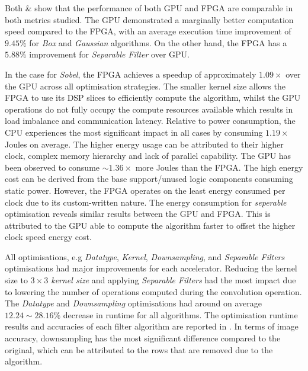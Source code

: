 Both  \&  show that the performance of both GPU and FPGA are comparable in both metrics studied. The GPU demonstrated a marginally better computation speed compared to the FPGA, with an average execution time improvement of $9.45\%$ for \textit{Box} and \textit{Gaussian} algorithms. On the other hand, the FPGA has a $5.88\%$ improvement for \textit{Separable Filter} over GPU. 

In the case for \textit{Sobel}, the FPGA achieves a speedup of approximately $1.09\times$ over the GPU across all optimisation strategies. The smaller kernel size allows the FPGA to use its DSP slices to efficiently compute the algorithm, whilst the GPU operations do not fully occupy the compute resources available which results in load imbalance and communication latency. Relative to power consumption, the CPU experiences the most significant impact in all cases by consuming $1.19\times$ Joules on average. The higher energy usage can be attributed to their higher clock, complex memory hierarchy and lack of parallel capability. The GPU has been observed to consume $\sim1.36\times$ more Joules than the FPGA. The high energy cost can be derived from the base support/unused logic components consuming static power. However, the FPGA operates on the least energy consumed per clock due to its custom-written nature. The energy consumption for \textit{seperable} optimisation reveals similar results between the GPU and FPGA. This is attributed to the GPU able to compute the algorithm faster to offset the higher clock speed energy cost. 

All optimisations, e.g \textit{Datatype}, \textit{Kernel}, \textit{Downsampling}, and \textit{Separable Filters} optimisations had major improvements for each accelerator. Reducing the kernel size to \textit{$3\times3$ kernel size} and applying \textit{Separable Filters} had the most impact due to lowering the number of operations computed during the convolution operation. The \textit{Datatype} and \textit{Downsampling} optimisations had around on average \textit{$12.24\sim28.16\%$} decrease in runtime for all algorithms. The optimisation runtime results and accuracies of each filter algorithm are reported in . In terms of image accuracy, downsampling has the most significant difference compared to the original, which can be attributed to the rows that are removed due to the algorithm.


